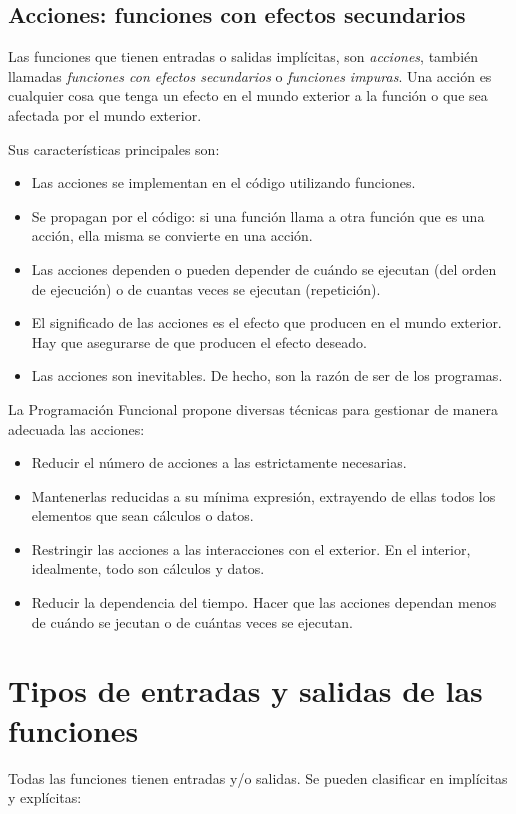 \subsection{Acciones: funciones con efectos secundarios}
Las funciones que tienen entradas o salidas implícitas, son \textit{acciones}, también llamadas \textit{funciones con efectos secundarios} o \textit{funciones impuras}. Una acción es cualquier cosa que tenga un efecto en el mundo exterior a la función o que sea afectada por el mundo exterior. 

Sus características principales son:

\begin{itemize}
   \item Las acciones se implementan en el código utilizando funciones.
   \item Se propagan por el código: si una función llama a otra función que es una acción, ella misma se convierte en una acción.
   \item Las acciones dependen o pueden depender de cuándo se ejecutan (del orden de ejecución) o de cuantas veces se ejecutan (repetición).
   \item El significado de las acciones es el efecto que producen en el mundo exterior. Hay que asegurarse de que producen el efecto deseado.
   \item Las acciones son inevitables. De hecho, son la razón de ser de los programas.
\end{itemize}

La Programación Funcional propone diversas técnicas para gestionar de manera adecuada las acciones:
\begin{itemize}
   \item Reducir el número de acciones a las estrictamente necesarias.
   \item Mantenerlas reducidas a su mínima expresión, extrayendo de ellas todos los elementos que sean cálculos o datos.
   \item Restringir las acciones a las interacciones con el exterior. En el interior, idealmente, todo son cálculos y datos.
   \item Reducir la dependencia del tiempo. Hacer que las acciones dependan menos de cuándo se jecutan o de cuántas veces se ejecutan.
\end{itemize}

\section{Tipos de entradas y salidas de las funciones}
Todas las funciones tienen entradas y/o salidas. Se pueden clasificar en implícitas y explícitas:


